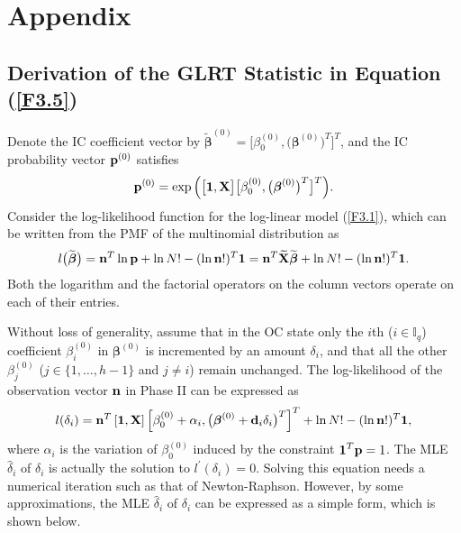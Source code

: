 \section{Appendix}\label{sec3.8}

\subsection{Derivation of the GLRT Statistic in Equation
(\ref{F3.5})}

Denote the IC coefficient vector by
$\widetilde{\bm{\beta}}^{(0)}=\big[\beta^{(0)}_0,\big(\bm{\beta}^{(0)}\big)^T\big]^T$,
and the IC probability vector ${\bf p}^{(0)}$ satisfies
\[
{\bf p}^{(0)}=\exp\Big(\big[\boldsymbol{1},{\bf
X}\big]\big[\beta^{(0)}_0,\big(\boldsymbol{\beta}^{(0)}\big)^T\big]^T\Big).
\]
Consider the log-likelihood function for the log-linear model (\ref{F3.1}), which
can be written from the PMF of the multinomial distribution as
\[
l\big(\widetilde{\boldsymbol{\beta}}\big)={\bf n}^T\ln{\bf p}+\ln N!-(\ln {\bf
n}!)^T\boldsymbol{1}={\bf n}^T\widetilde{{\bf X}}\widetilde{\boldsymbol{\beta}}+\ln N!-(\ln {\bf
n}!)^T\boldsymbol{1}.
\]
Both the logarithm and the factorial operators on the column vectors operate on each
of their entries.

Without loss of generality, assume that in the OC state only the $i$th
($i\in\mathbb{I}_q$) coefficient $\beta_i^{(0)}$ in $\bm{\beta}^{(0)}$ is
incremented by an amount $\delta_i$, and that all the other $\beta_j^{(0)}$
($j\in\{1,\ldots,h-1\}$ and $j\ne i$) remain unchanged. The log-likelihood of the
observation vector ${\bf n}$ in Phase II can be expressed as
\[
l(\delta_i)={\bf n}^T\left[\boldsymbol{1},{\bf
X}\right]\left[\beta^{(0)}_0+\alpha_i,\big(\boldsymbol{\beta}^{(0)}+{\bf
d}_i\delta_i\big)^T\right]^T+\ln N!-(\ln{\bf n}!)^T\boldsymbol{1},
\]
where $\alpha_i$ is the variation of $\beta^{(0)}_0$ induced by the constraint
$\boldsymbol{1}^T{\bf p}=1$. The MLE $\hat{\delta}_i$ of $\delta_i$ is actually the solution
to $l^{\prime}(\delta_i)=0$. Solving this equation needs a numerical iteration such
as that of Newton-Raphson. However, by some approximations, the MLE $\hat{\delta}_i$
of $\delta_i$ can be expressed as a simple form, which is shown below.

